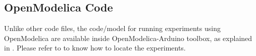 




\subsection{OpenModelica Code}
\label{sec:dcmotor-OpenModelica-code}
Unlike other code files, the code/model for running experiments using OpenModelica are 
available inside OpenModelica-Arduino toolbox, as explained in .
Please refer to  to know how to locate the experiments. 

